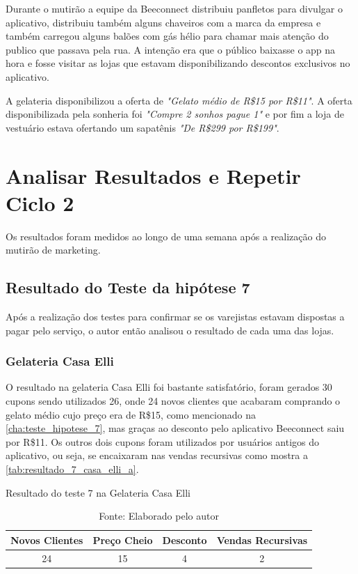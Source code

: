 Durante o mutirão a equipe da Beeconnect distribuiu panfletos para divulgar o aplicativo, distribuiu também alguns chaveiros com a marca da empresa e também carregou alguns balões com gás hélio para chamar mais atenção do publico que passava pela rua. A intenção era que o público baixasse o app na hora e fosse visitar as lojas que estavam disponibilizando descontos exclusivos no aplicativo.

A gelateria disponibilizou a oferta de \textit{"Gelato médio de R\$15 por R\$11"}. A oferta disponibilizada pela sonheria foi \textit{"Compre 2 sonhos pague 1"} e por fim a loja de vestuário estava ofertando um sapatênis \textit{"De R\$299 por R\$199"}.

\section{Analisar Resultados e Repetir Ciclo 2}
\label{cha:analisar_resultados_2}
Os resultados foram medidos ao longo de uma semana após a realização do mutirão de marketing.

\subsection{Resultado do Teste da hipótese 7}
\label{cha:resultado_7}
Após a realização dos testes para confirmar se os varejistas estavam dispostas a pagar pelo serviço, o autor então analisou o resultado de cada uma das lojas.

\subsubsection{Gelateria Casa Elli}
\label{cha:resultado_casa_elli}
O resultado na gelateria Casa Elli foi bastante satisfatório, foram gerados 30 cupons sendo utilizados 26, onde 24 novos clientes que acabaram comprando o gelato médio cujo preço era de R\$15, como mencionado na \autoref{cha:teste_hipotese_7}, mas graças ao desconto pelo aplicativo Beeconnect saiu por R\$11. Os outros dois cupons foram utilizados por usuários antigos do aplicativo, ou seja, se encaixaram nas vendas recursivas como mostra a \autoref{tab:resultado_7_casa_elli_a}.

\begin{table}[H]
\centering
\caption{Resultado do teste 7 na Gelateria Casa Elli}
\label{tab:resultado_7_casa_elli_a}
\begin{tabular}{|c|c|c|c|}
\hline
Novos Clientes & Preço Cheio & Desconto & Vendas Recursivas \\ \hline
24             & 15          & 4        & 2   \\ \hline
\end{tabular}
\caption* {Fonte: Elaborado pelo autor}    
\end{table}

